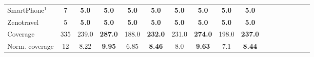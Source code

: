 \documentclass[letterpaper]{article} %
\begin{document}
\begin{table}
{\begin{tabular}{lccccccccccccccccl}
			SmartPhone$^{1}$ & 7 & \textbf{5.0} & \textbf{5.0} & \textbf{5.0} & \textbf{5.0} & \textbf{5.0} & \textbf{5.0} & \textbf{5.0} &\multicolumn{2}{c}{ \textbf{5.0}  } \\ 
			Zenotravel & 5 & \textbf{5.0} & \textbf{5.0} & \textbf{5.0} & \textbf{5.0} & \textbf{5.0} & \textbf{5.0} & \textbf{5.0} &\multicolumn{2}{c}{ \textbf{5.0}  } \\ 
			\midrule 
			Coverage & 335 & 239.0 & \textbf{287.0} & 188.0 & \textbf{232.0} & 231.0 & \textbf{274.0} & 198.0 &\multicolumn{2}{c}{ \textbf{237.0}  } \\ 
			Norm. coverage & 12 & 8.22 & \textbf{9.95} & 6.85 & \textbf{8.46} & 8.0 & \textbf{9.63} & 7.1 &\multicolumn{2}{c}{ \textbf{8.44}  } \\ 
			\bottomrule 
		\end{tabular}
	}
\end{table}
\end{document}
